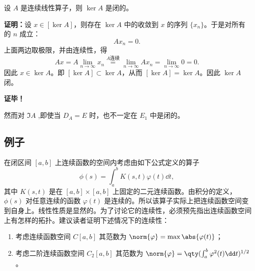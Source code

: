 \begin{theorem}{}
设 $A$ 是连续线性算子，则 $\ker A$ 是闭的。
\end{theorem}
\textbf{证明：}设 $x\in[\ker A]$，则存在 $\ker A$ 中的收敛到 $x$ 的序列 $\{x_n\}$。于是对所有的 $n$ 成立：
\begin{equation}
Ax_n=0.~
\end{equation}
 上面两边取极限，并由连续性，得 \begin{equation}
 Ax=A\lim_{n\rightarrow\infty}x_n\overset{A\text{连续}}{=}\lim_{n\rightarrow\infty}A x_n=\lim_{n\rightarrow\infty}0=0.~
 \end{equation}
 因此 $x\in\ker A$。即 $[\ker A]\subset\ker A$，从而 $[\ker A]=\ker A$。因此 $\ker A$ 闭。

\textbf{证毕！}

然而对 $\Im A$ ,即使当 $D_A=E$ 时，也不一定在 $E_1$ 中是闭的。


\subsection{例子}

\begin{example}{}
在闭区间 $[a,b]$ 上连续函数的空间内考虑由如下公式定义的算子
\begin{equation}
\phi(s)=\int_a^bK(s,t)\varphi(t)\dd t,~
\end{equation}
其中 $K(s,t)$ 是在 $[a,b]\times[a,b]$ 上固定的二元连续函数。由积分的定义，$\phi(s)$ 对任意连续的函数 $\varphi(t)$ 是连续的。所以该算子实际上把连续函数空间变到自身上。线性性质是显然的。为了讨论它的连续性，必须预先指出连续函数空间上有怎样的拓扑。建议读者证明下述情况下的连续性：
\begin{enumerate}
\item 考虑连续函数空间 $C[a,b]$ 其范数为 $\norm{\varphi}=\max{\abs{\varphi(t)}}$；
\item 考虑二阶连续函数空间 $C_2[a,b]$ 其范数为 $\norm{\varphi}=\qty(\int_a^b\varphi^2(t)\dd t)^{1/2}$。
\end{enumerate}

\end{example}

